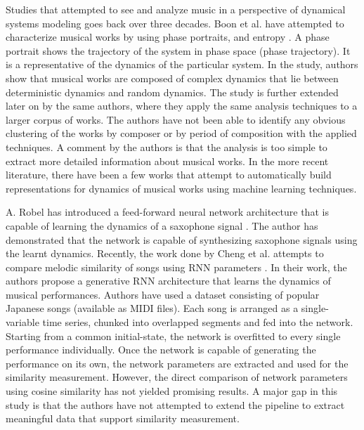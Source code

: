 \documentclass[../main.tex]{subfiles}
\begin{document}
\par
Studies that attempted to see and analyze music in a perspective of dynamical systems modeling goes back over three decades. Boon et al. have attempted to characterize musical works by using phase portraits, and entropy \cite{complex_dynamics}. A phase portrait shows the trajectory of the system in phase space (phase trajectory). It is a representative of the dynamics of the particular system. In the study,  authors show that musical works are composed of complex dynamics that lie between deterministic dynamics and random dynamics. The study is further extended later on by the same authors\cite{boonDynamicalSystemsTheory1995}, where they apply the same analysis techniques to a larger corpus of works. The authors have not been able to identify any obvious clustering of the works by composer or by period of composition with the applied techniques. A comment by the authors is that the analysis is too simple to extract more detailed information about musical works. In the more recent literature, there have been a few works that attempt to automatically build representations for dynamics of musical works using machine learning techniques.

\par
A. Robel has introduced a feed-forward neural network architecture that is capable of learning the dynamics of a saxophone signal \cite{robelNeuralNetworkModeling1997}. The author has demonstrated that the network is capable of synthesizing saxophone signals using the learnt dynamics. Recently, the work done by Cheng et al. attempts to compare melodic similarity of songs using \gls{RNN} parameters \cite{tian_cheng_comparing_2018}. In their work, the authors propose a generative \gls{RNN} architecture that learns the dynamics of  musical performances. Authors have used a dataset consisting of popular Japanese songs (available as \gls{MIDI} files). Each song is arranged as a single-variable time series, chunked into overlapped segments and fed into the network. Starting from a common initial-state, the network is overfitted to every single performance individually. Once the network is capable of generating the performance on its own, the network parameters are extracted and used for the similarity measurement. However, the direct comparison of network parameters using cosine similarity has not yielded promising results. A major gap in this study is that the authors have not attempted to extend the pipeline to extract meaningful data that support similarity measurement.
\end{document}
